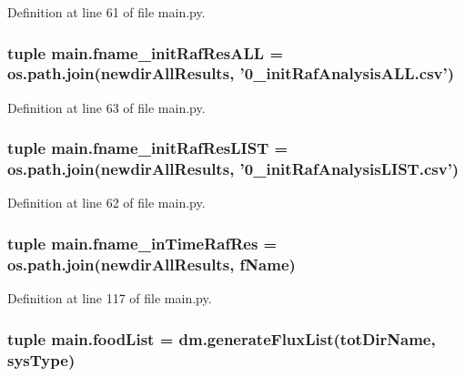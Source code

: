 Definition at line 61 of file main.\+py.

\hypertarget{a00153_a1b43b3b737d94a412b2334b78252cdef}{
\subsubsection[{fname\+\_\+init\+Raf\+Res\+A\+L\+L}]{\setlength{\rightskip}{0pt plus 5cm}tuple main.\+fname\+\_\+init\+Raf\+Res\+A\+L\+L = os.\+path.\+join({\bf newdir\+All\+Results}, '0\+\_\+init\+Raf\+Analysis\+A\+L\+L.\+csv')}}\label{a00153_a1b43b3b737d94a412b2334b78252cdef}


Definition at line 63 of file main.\+py.

\hypertarget{a00153_adf05ced8171427a0ea7daf7e595f72b6}{
\subsubsection[{fname\+\_\+init\+Raf\+Res\+L\+I\+S\+T}]{\setlength{\rightskip}{0pt plus 5cm}tuple main.\+fname\+\_\+init\+Raf\+Res\+L\+I\+S\+T = os.\+path.\+join({\bf newdir\+All\+Results}, '0\+\_\+init\+Raf\+Analysis\+L\+I\+S\+T.\+csv')}}\label{a00153_adf05ced8171427a0ea7daf7e595f72b6}


Definition at line 62 of file main.\+py.

\hypertarget{a00153_a64d742d069748ddd43a9378ef918d0b1}{
\subsubsection[{fname\+\_\+in\+Time\+Raf\+Res}]{\setlength{\rightskip}{0pt plus 5cm}tuple main.\+fname\+\_\+in\+Time\+Raf\+Res = os.\+path.\+join({\bf newdir\+All\+Results}, {\bf f\+Name})}}\label{a00153_a64d742d069748ddd43a9378ef918d0b1}


Definition at line 117 of file main.\+py.

\hypertarget{a00153_a07ce1f0750b6dc5baff89792fc194152}{
\subsubsection[{food\+List}]{\setlength{\rightskip}{0pt plus 5cm}tuple main.\+food\+List = dm.\+generate\+Flux\+List({\bf tot\+Dir\+Name}, sys\+Type)}}\label{a00153_a07ce1f0750b6dc5baff89792fc194152}


